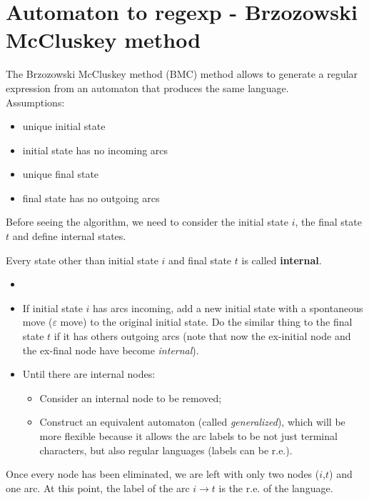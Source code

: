 	\section{Automaton to regexp - Brzozowski McCluskey method}
		The Brzozowski McCluskey method (BMC) method allows to generate a regular expression from an automaton that produces the same language.\\
		Assumptions:
		\begin{itemize}
			\item unique initial state
			\item initial state has no incoming arcs
			\item unique final state
			\item final state has no outgoing arcs
		\end{itemize}
		Before seeing the algorithm, we need to consider the initial state $i$, the final state $t$ and define internal states.
		\begin{definition}
			Every state other than initial state $i$ and final state $t$ is called \textbf{internal}.
		\end{definition}
		\begin{algorithm}
			\begin{itemize}
				\item[]
				\item If initial state $i$ has arcs incoming, add a new initial state with a spontaneous move ($\varepsilon$ move) to the original initial state. Do 
				the similar thing to the final state $t$ if it has others outgoing arcs (note that now the ex-initial node and the ex-final node have become 
				\emph{internal}).
				\item Until there are internal nodes:
				\begin{itemize}
					\item Consider an internal node to be removed;
					\item Construct an equivalent automaton (called \emph{generalized}), which will be more flexible because it allows the arc labels to be not just
					terminal characters, but also regular languages (labels can be r.e.).
				\end{itemize}
			\end{itemize}
			Once every node has been eliminated, we are left with only two nodes ($i$,$t$) and one arc. At this point, the label of the arc $i\longrightarrow t$ is the 
			r.e. of the language.
		\end{algorithm}
